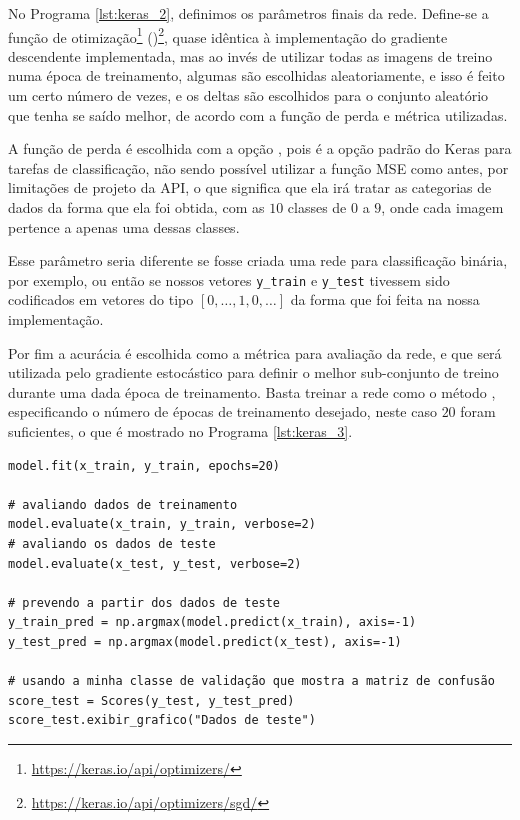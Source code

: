 No Programa \ref{lst:keras_2}, definimos os parâmetros finais da rede. Define-se a função de otimização\footnote{\url{https://keras.io/api/optimizers/}}  ()\footnote{\url{https://keras.io/api/optimizers/sgd/}}, quase idêntica à implementação do gradiente descendente implementada, mas ao invés de utilizar todas as imagens de treino numa época de treinamento, algumas são escolhidas aleatoriamente, e isso é feito um certo número de vezes, e os deltas são escolhidos para o conjunto aleatório que tenha se saído melhor, de acordo com a função de perda e métrica utilizadas.

A função de perda é escolhida com a opção , pois é a opção padrão do Keras para tarefas de classificação, não sendo possível utilizar a função MSE como antes, por limitações de projeto da API, o que significa que ela irá tratar as categorias de dados da forma que ela foi obtida, com as $10$ classes de $0$ a $9$, onde cada imagem pertence a apenas uma dessas classes. 

Esse parâmetro seria diferente se fosse criada uma rede para classificação binária, por exemplo, ou então se nossos vetores \texttt{y\_train} e \texttt{y\_test} tivessem sido codificados em vetores do tipo $[0,\ldots,1,0,\ldots]$ da forma que foi feita na nossa implementação.

Por fim a acurácia é escolhida como a métrica para avaliação da rede, e que será utilizada pelo gradiente estocástico para definir o melhor sub-conjunto de treino durante uma dada época de treinamento. Basta treinar a rede como o método , especificando o número de épocas de treinamento desejado, neste caso $20$ foram suficientes, o que é mostrado no Programa \ref{lst:keras_3}.
\newline
\estiloR
\begin{lstlisting}[caption={Trecho do script \eng{mnist\_keras.py}},label={lst:keras_3},escapeinside={\%}]
model.fit(x_train, y_train, epochs=20)

# avaliando dados de treinamento
model.evaluate(x_train, y_train, verbose=2)
# avaliando os dados de teste
model.evaluate(x_test, y_test, verbose=2)

# prevendo a partir dos dados de teste
y_train_pred = np.argmax(model.predict(x_train), axis=-1)
y_test_pred = np.argmax(model.predict(x_test), axis=-1)

# usando a minha classe de validação que mostra a matriz de confusão
score_test = Scores(y_test, y_test_pred)
score_test.exibir_grafico("Dados de teste")
\end{lstlisting}


